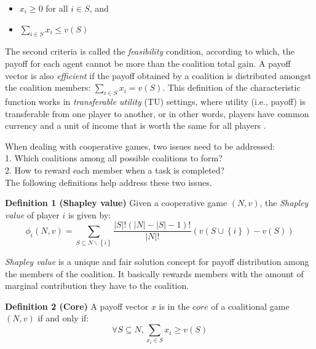 \documentclass[10pt,journal,cspaper,compsoc]{IEEEtran}
\begin{document}
\begin{itemize}
    \item $x_i \geq 0$ for all $i \in S$, and
    \item $\sum_{i \in S} x_i \leq v(S)$
\end{itemize}

The second criteria is called the \emph{feasibility} condition,
according to which, the payoff for each agent cannot be more than
the coalition total gain. A payoff vector is also \emph{efficient}
if the payoff obtained by a coalition is distributed amongst the
coalition members: $\sum_{i \in S} x_i = v(S)$. This definition of
the characteristic function works in \emph{transferable utility}
(TU) settings, where utility (i.e., payoff) is transferable from
one player to another, or in other words, players have common
currency and a unit of income that is worth the same for all players
\cite{myerson1991game}.

When dealing with cooperative games, two issues need to be
addressed:\\ 1. Which coalitions among all possible coalitions to form? \\
2. How to reward each member when a task is completed?\\
%
The following definitions help address these two issues.


{\bf Definition 1 (Shapley value)} Given a cooperative game $(N,
v)$, the \emph{Shapley value} of player $i$ is given
by\cite{shapley_value}:
\begin{equation}\label{eq:shapley}
\phi_i(N,v) = \sum_{S \subseteq N \backslash \left\{i\right\} }
\frac{|S|! (|N|-|S|-1)!}{|N|!} (v(S \cup \left\{i\right\}) - v(S))
\end{equation}

\emph{Shapley value} is a unique and fair solution concept for
payoff distribution among the members of the coalition. It
basically rewards members with the amount of marginal contribution
they have to the coalition.


{\bf Definition 2 (Core)} A payoff vector $x$ is in the $core$ of
a coalitional game $(N, v)$ if and only if:
\begin{equation}\label{eq:core}
\forall S \subseteq N, \sum_{x_i \in S} x_i \geq v(S)
\end{equation}
\end{document}
